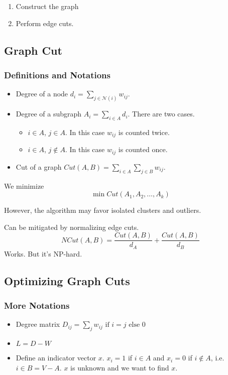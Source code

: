         \begin{enumerate}
            \item Construct the graph
            \item Perform edge cuts.
        \end{enumerate}

    \subsection{Graph Cut}
        \subsubsection{Definitions and Notations}
            \begin{itemize}
                \item Degree of a node $d_i = \sum_{j\in \mathcal{N}(i)}w_{ij}$.
                \item Degree of a subgraph $A_i = \sum_{i \in A}d_i$. There are two cases.
                    \begin{itemize}
                        \item $i \in A$, $j \in A$. In this case $w_{ij}$ is counted twice.
                        \item $i \in A$, $j \notin A$. In this case $w_{ij}$ is counted once.
                    \end{itemize}
                \item Cut of a graph $Cut(A, B) = \sum_{i \in A}\sum_{j \in B}w_{ij}$.
            \end{itemize}

        We minimize
        \[ \min Cut(A_1,A_2,\dots,A_k) \]

        However, the algorithm may favor isolated clusters and outliers.

        Can be mitigated by normalizing edge cuts.
        \[ NCut(A,B) = \frac{Cut(A,B)}{d_A} + \frac{Cut(A,B)}{d_B}\]
        Works. But it's NP-hard.

    \subsection{Optimizing Graph Cuts}
        \subsubsection{More Notations}
            \begin{itemize}
                \item Degree matrix $D_{ij} = \text{$\sum_j w_{ij}$ if $i=j$ else $0$}$
                \item $L=D-W$
                \item Define an indicator vector $x$. $x_i = 1$ if $i \in A$ and $x_i=0$ if $i \notin A$, i.e. $i \in B = V-A$. $x$ is unknown and we want to find $x$.
            \end{itemize}

